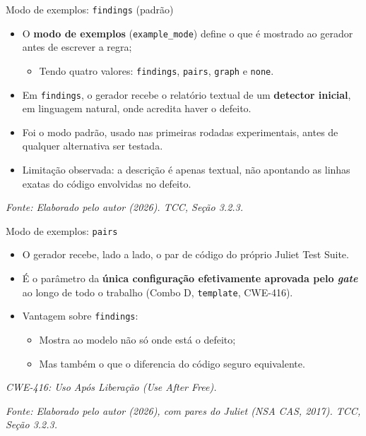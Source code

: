 \documentclass[
    aspectratio=169,
    12pt,
    brazil
]{beamer}
\newcommand{\fonte}[1]{{\tiny\itshape Fonte: #1\par}}
\begin{document}
\begin{frame}{Modo de exemplos: \texttt{findings} (padrão)}
  \begin{itemize}
    \item O \textbf{modo de exemplos} (\texttt{example\_mode}) define o que é mostrado ao gerador antes de escrever a regra;
    \begin{itemize}
      \item Tendo quatro valores: \texttt{findings}, \texttt{pairs}, \texttt{graph} e \texttt{none}.
    \end{itemize}
    \item Em \texttt{findings}, o gerador recebe o relatório textual de um \textbf{detector inicial}, em linguagem natural, onde acredita haver o defeito.
    \item Foi o modo padrão, usado nas primeiras rodadas experimentais, antes de qualquer alternativa ser testada.
    \item Limitação observada: a descrição é apenas textual, não apontando as linhas exatas do código envolvidas no defeito.
  \end{itemize}
  \vfill
  \fonte{Elaborado pelo autor (2026). TCC, Seção 3.2.3.}
\end{frame}

\begin{frame}{Modo de exemplos: \texttt{pairs}}
  \begin{itemize}
    \item O gerador recebe, lado a lado, o par de código do próprio Juliet Test Suite.
    \item É o parâmetro da \textbf{única configuração efetivamente aprovada pelo \textit{gate}} ao longo de todo o trabalho (Combo D, \texttt{template}, CWE-416).
    \item Vantagem sobre \texttt{findings}:
    \begin{itemize}
      \item Mostra ao modelo não só onde está o defeito;
      \item Mas também o que o diferencia do código seguro equivalente.
    \end{itemize}
  \end{itemize}
  \vfill
  {\tiny\itshape CWE-416: Uso Após Liberação (\textit{Use After Free}).\par}
  \fonte{Elaborado pelo autor (2026), com pares do Juliet (NSA CAS, 2017). TCC, Seção 3.2.3.}
\end{frame}
\end{document}
